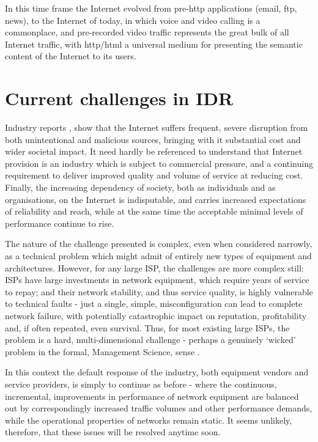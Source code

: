 In this time frame the Internet evolved from pre-http applications (email, ftp, news), to the Internet of today, in which voice and video calling is a commonplace, and pre-recorded video traffic represents the great bulk of all Internet traffic, with http/html a universal medium for presenting the semantic content of the Internet to its users.

\section{Current challenges in IDR}

Industry reports \cite{kolman2015},\cite{Robachevsky2025IntroducingMANRS} show that the Internet suffers frequent, severe disruption from both unintentional and malicious sources, bringing with it substantial cost and wider societal impact.
It need hardly be referenced to understand that Internet provision is an industry which is subject to commercial pressure, and a continuing requirement to deliver improved quality and volume of service at reducing cost.
Finally, the increasing dependency of society, both as individuals and as organisations, on the Internet is indisputable, and carries increased expectations of reliability and reach, while at the same time the acceptable minimal levels of performance continue to rise.

The nature of the challenge presented is complex, even when considered narrowly, as a technical problem which might admit of entirely new types of equipment and architectures.
However, for any large ISP, the challenges are more complex still: ISPs have large investments in network equipment, which require years of service to repay; and their network stability, and thus service quality, is highly vulnerable to technical faults - just a single, simple, misconfiguration can lead to complete network failure, with potentially catastrophic impact on reputation, profitability and, if often repeated, even survival.
Thus, for most existing large ISPs, the problem is a hard, multi-dimensional challenge - perhaps a genuinely ‘wicked’ problem in the formal, Management Science, sense \cite{Rittel1973DilemmasPlanning}.

In this context the default response of the industry, both equipment vendors and service providers, is simply to continue as before - where the continuous, incremental, improvements in performance of network equipment are balanced out by correspondingly increased traffic volumes and other performance demands, while the operational properties of networks remain static.
It seems unlikely, therefore, that these issues will be resolved anytime soon.


